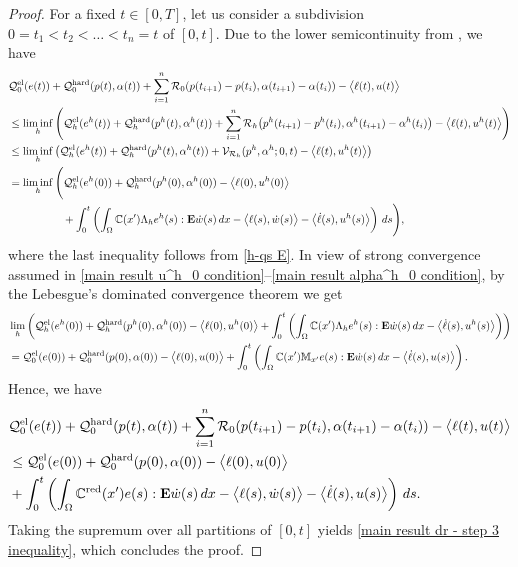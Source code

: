 \documentclass[reqno,10pt]{amsart}
\numberwithin{equation}{section}
\theoremstyle{remark}
\newcommand{\C}{\mathbb{C}}
\newcommand{\M}{\mathbb{M}}
\newcommand{\calQ}{\mathcal{Q}}
\newcommand{\calR}{\mathcal{R}}
\newcommand{\calV}{\mathcal{V}}
\newcommand{\E}{{\bf E}}
\newcommand{\red}[1]{#1^{\rm red}}
\begin{document}
\begin{proof}
For a fixed $t \in [0, T]$, let us consider a subdivision $0 = t_1 < t_2 < \ldots < t_n = t$ of $[0,t]$.
Due to the lower semicontinuity from , we have 
{\allowdisplaybreaks
\begin{align*}
	& \calQ^{\rm el}_{0}(e(t)) + \calQ^{\rm hard}_{0}(p(t), \alpha(t)) + \sum_{i = 1}^{n} \calR_{0}\!\left(p(t_{i+1}) - p(t_i), \alpha(t_{i+1}) - \alpha(t_i)\right) - \big\langle \ell(t), u(t) \big\rangle
	\\*& \leq \liminf\limits_{h}\left( \calQ^{\rm el}_{h}(e^h(t)) + \calQ^{\rm hard}_{h}(p^h(t), \alpha^h(t)) + \sum_{i = 1}^{n} \calR_{h}\!\left(p^h(t_{i+1}) - p^h(t_i), \alpha^h(t_{i+1}) - \alpha^h(t_i)\right) - \big\langle \ell(t), u^h(t) \big\rangle \right)
	\\& \leq \liminf\limits_{h}\left( \calQ^{\rm el}_{h}(e^h(t)) + \calQ^{\rm hard}_{h}(p^h(t), \alpha^h(t)) + \calV_{\calR_{h}}(p^h, \alpha^h; 0, t) - \big\langle \ell(t), u^h(t) \big\rangle \right)
	\\& = \liminf\limits_{h}\Bigg( 
	\calQ^{\rm el}_{h}(e^h(0)) + \calQ^{\rm hard}_{h}(p^h(0), \alpha^h(0)) 
	- \big\langle \ell(0), u^h(0) \big\rangle
	\\*& \quad\quad\quad\quad\quad + \int_0^t \left( \int_{\Omega} \C(x') \Lambda_h e^h(s) : {\E}\dot{w}(s) \,dx 
	- \big\langle \ell(s), \dot{w}(s) \big\rangle - \big\langle \dot{\ell}(s), u^h(s) \big\rangle \right) \,ds
	\Bigg),
\end{align*}
}\noindent
where the last inequality follows from \ref{h-qs E}.
In view of strong convergence assumed in \eqref{main result u^h_0 condition}--\eqref{main result alpha^h_0 condition}, by the Lebesgue's dominated convergence theorem we get
\begin{align*}
	& \lim\limits_{h}\left( \calQ^{\rm el}_{h}(e^h(0)) + \calQ^{\rm hard}_{h}(p^h(0), \alpha^h(0)) - \big\langle \ell(0), u^h(0) \big\rangle + \int_0^t \left( \int_{\Omega} \C(x') \Lambda_h e^h(s) : {\E}\dot{w}(s) \,dx - \big\langle \dot{\ell}(s), u^h(s) \big\rangle \right) \right)\\
	& = \calQ^{\rm el}_{0}(e(0)) + \calQ^{\rm hard}_{0}(p(0), \alpha(0)) - \big\langle \ell(0), u(0) \big\rangle + \int_0^t \left( \int_{\Omega} \C(x') \M_{x'} e(s) : {\E}\dot{w}(s) \,dx - \big\langle \dot{\ell}(s), u(s) \big\rangle \right).
\end{align*}
Hence, we have
\begin{align*}
	& \calQ^{\rm el}_{0}(e(t)) + \calQ^{\rm hard}_{0}(p(t), \alpha(t)) 
	+ \sum_{i = 1}^{n} \calR_{0}\!\left(p(t_{i+1}) - p(t_i), \alpha(t_{i+1}) - \alpha(t_i)\right) 
	- \big\langle \ell(t), u(t) \big\rangle
	\\& \leq \calQ^{\rm el}_{0}(e(0)) + \calQ^{\rm hard}_{0}(p(0), \alpha(0)) 
	- \big\langle \ell(0), u(0) \big\rangle 
	\\& + \int_0^t \left( \int_{\Omega} \red{\C}(x') e(s) : {\E}\dot{w}(s) \,dx - \big\langle \ell(s), \dot{w}(s) \big\rangle - \big\langle \dot{\ell}(s), u(s) \big\rangle \right) \,ds.
\end{align*}
Taking the supremum over all partitions of $[0,t]$ yields \eqref{main result dr - step 3 inequality}, which concludes the proof.
\end{proof}
\end{document}
